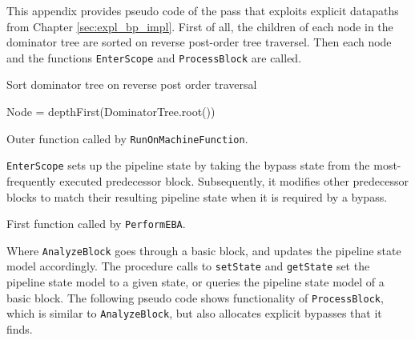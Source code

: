 
This appendix provides pseudo code of the pass that exploits explicit datapaths from Chapter \ref{sec:expl_bp_impl}. First of all, the children of each node in the dominator tree are sorted on reverse post-order tree traversel. Then each node and the functions \texttt{EnterScope} and \texttt{ProcessBlock} are called.\\

\begin{algorithm}[H]
 Sort dominator tree on reverse post order traversal\;
 
 Node = depthFirst(DominatorTree.root())\;
 \caption{Outer function called by \texttt{RunOnMachineFunction}.}
\end{algorithm}

\texttt{EnterScope} sets up the pipeline state by taking the bypass state from the most-frequently executed predecessor block. Subsequently, it modifies other predecessor blocks to match their resulting pipeline state when it is required by a bypass.\\

\begin{algorithm}[H]
 \caption{First function called by \texttt{PerformEBA}.}
\end{algorithm}



\newpage



Where \texttt{AnalyzeBlock} goes through a basic block, and updates the pipeline state model accordingly. The procedure calls to \texttt{setState} and \texttt{getState} set the pipeline state model to a given state, or queries the pipeline state model of a basic block. The following pseudo code shows functionality of \texttt{ProcessBlock}, which is similar to \texttt{AnalyzeBlock}, but also allocates explicit bypasses that it finds.

